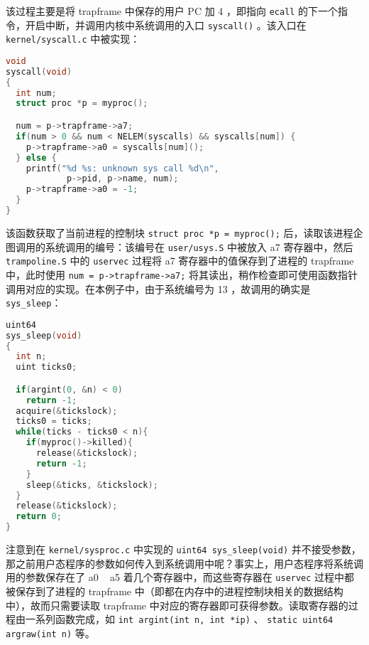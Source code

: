该过程主要是将 trapframe 中保存的用户 PC 加 4 ，即指向 \lstinline{ecall} 的下一个指令，开启中断，并调用内核中系统调用的入口 \lstinline{syscall()} 。该入口在 \lstinline{kernel/syscall.c} 中被实现：
\begin{lstlisting}[language=C]
void
syscall(void)
{
  int num;
  struct proc *p = myproc();

  num = p->trapframe->a7;
  if(num > 0 && num < NELEM(syscalls) && syscalls[num]) {
    p->trapframe->a0 = syscalls[num]();
  } else {
    printf("%d %s: unknown sys call %d\n",
            p->pid, p->name, num);
    p->trapframe->a0 = -1;
  }
}
\end{lstlisting}

该函数获取了当前进程的控制块 \lstinline{struct proc *p = myproc();} 后，读取该进程企图调用的系统调用的编号：该编号在 \lstinline{user/usys.S} 中被放入 a7 寄存器中，然后 \lstinline{trampoline.S} 中的 \lstinline{uservec} 过程将 a7 寄存器中的值保存到了进程的 trapframe 中，此时使用 \lstinline{num = p->trapframe->a7;} 将其读出，稍作检查即可使用函数指针调用对应的实现。在本例子中，由于系统编号为 13 ，故调用的确实是 \lstinline{sys_sleep}：
\begin{lstlisting}[language=C]
uint64
sys_sleep(void)
{
  int n;
  uint ticks0;

  if(argint(0, &n) < 0)
    return -1;
  acquire(&tickslock);
  ticks0 = ticks;
  while(ticks - ticks0 < n){
    if(myproc()->killed){
      release(&tickslock);
      return -1;
    }
    sleep(&ticks, &tickslock);
  }
  release(&tickslock);
  return 0;
}
\end{lstlisting}

注意到在 \lstinline{kernel/sysproc.c} 中实现的 \lstinline{uint64 sys_sleep(void)} 并不接受参数，那之前用户态程序的参数如何传入到系统调用中呢？事实上，用户态程序将系统调用的参数保存在了 a0 ~ a5 着几个寄存器中，而这些寄存器在 \lstinline{uservec} 过程中都被保存到了进程的 trapframe 中（即都在内存中的进程控制块相关的数据结构中），故而只需要读取 trapframe 中对应的寄存器即可获得参数。读取寄存器的过程由一系列函数完成，如 \lstinline{int argint(int n, int *ip)} 、 \lstinline{static uint64 argraw(int n)} 等。

